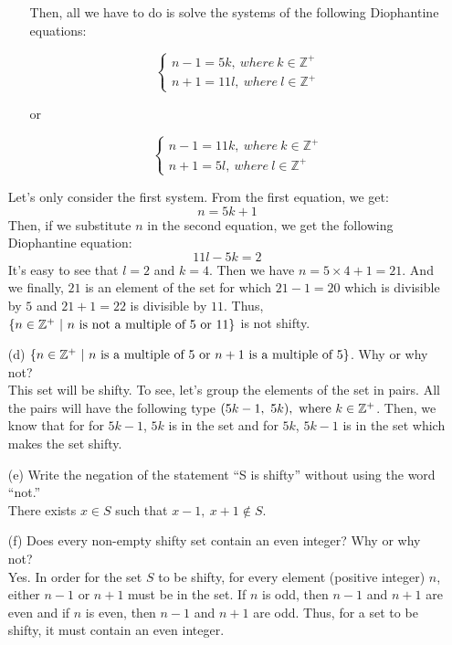 \documentclass[12pt, a4paper]{article}                  %
\begin{document}
\begin{enumerate}
\begin{enumerate}
Then, all we have to do is solve the systems of the following Diophantine equations:

$$
\begin{cases}
n - 1 = 5k, \ where \ k \in \mathbb{Z}^+\\
n + 1 = 11l, \ where \ l \in \mathbb{Z}^+
\end{cases}
$$
\begin{center}
or
\end{center}
$$
\begin{cases}
n - 1 = 11k, \ where \ k \in \mathbb{Z}^+\\
n + 1 = 5l, \ where \ l \in \mathbb{Z}^+
\end{cases}
$$

\end{enumerate}
Let's only consider the first system. From the first equation, we get:
$$n = 5k + 1$$
Then, if we substitute $n$ in the second equation, we get the following Diophantine equation:
$$11l - 5k = 2$$
It's easy to see that $l = 2$ and $k = 4$. Then we have $n = 5 \times 4 + 1 = 21$.
And we finally, $21$ is an element of the set for which $21 - 1 = 20$ which is divisible
by $5$ and $21 + 1 = 22$ is divisible by $11$.
Thus,  $\{n \in \mathbb{Z}^+ \ \vert \ n \ \textnormal{is not a multiple of 5 or 11} \}$ is not shifty.
\\
\item[(d)]
$\{n \in \mathbb{Z}^+ \ \vert \ n \ \textnormal{is a multiple of 5 or $n + 1$ is a multiple of 5} \}$.
Why or why not?\\

This set will be shifty. To see, let's group the elements of the set in pairs.
All the pairs will have the following type $(5k-1,\ 5k), \ \textnormal{where} \ k \in \mathbb{Z}^+$.
Then, we know that for for $5k-1$, $5k$ is in the set and for $5k$, $5k-1$ is in the set
which makes the set shifty.
\\
\item[(e)]
Write the negation of the statement “S is shifty” without using the word “not.”\\

There exists $x \in S$ such that $x-1, \ x+1 \notin S$.
\\
\item[(f)]
Does every non-empty shifty set contain an even integer? Why or why not?\\

Yes. In order for the set $S$ to be shifty, for every element (positive integer) $n$, either $n - 1$
or $n + 1$ must be in the set. If $n$ is odd, then $n-1$ and $n+1$ are even and if $n$ is even, then
$n-1$ and $n+1$ are odd. Thus, for a set to be shifty, it must contain an even integer.


\end{enumerate}
\end{document}
